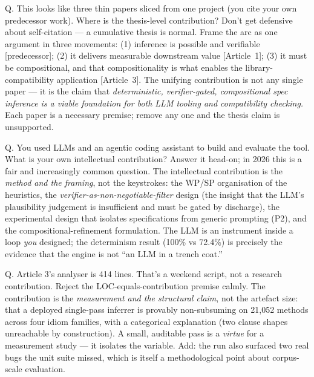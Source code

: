 \documentclass[11pt]{article}
\begin{document}
\begin{qbox}{Q. This looks like three thin papers sliced from one project (you cite your own predecessor work). Where is the thesis-level contribution?}
Don't get defensive about self-citation --- a cumulative thesis is normal.
Frame the arc as one argument in three movements: (1) inference is possible and
verifiable [predecessor]; (2) it delivers measurable downstream value
[Article~1]; (3) it must be compositional, and that compositionality is what
enables the library-compatibility application [Article~3]. The unifying
contribution is not any single paper --- it is the claim that
\emph{deterministic, verifier-gated, compositional spec inference is a viable
foundation for both LLM tooling and compatibility checking.} Each paper is a
necessary premise; remove any one and the thesis claim is unsupported.
\end{qbox}

\begin{qbox}{Q. You used LLMs and an agentic coding assistant to build and evaluate the tool. What is your own intellectual contribution?}
Answer it head-on; in 2026 this is a fair and increasingly common question.
The intellectual contribution is the \emph{method and the framing}, not the
keystrokes: the WP/SP organisation of the heuristics, the
\emph{verifier-as-non-negotiable-filter} design (the insight that the LLM's
plausibility judgement is insufficient and must be gated by discharge), the
experimental design that isolates specifications from generic prompting (P2),
and the compositional-refinement formulation. The LLM is an instrument inside a
loop \emph{you} designed; the determinism result (100\% vs 72.4\%) is precisely
the evidence that the engine is not ``an LLM in a trench coat.''
\end{qbox}

\begin{qbox}{Q. Article 3's analyser is 414 lines. That's a weekend script, not a research contribution.}
Reject the LOC-equals-contribution premise calmly. The contribution is the
\emph{measurement and the structural claim}, not the artefact size: that a
deployed single-pass inferrer is provably non-subsuming on 21{,}052 methods
across four idiom families, with a categorical explanation (two clause shapes
unreachable by construction). A small, auditable pass is a \emph{virtue} for a
measurement study --- it isolates the variable. Add: the run also surfaced two
real bugs the unit suite missed, which is itself a methodological point about
corpus-scale evaluation.
\end{qbox}
\end{document}
